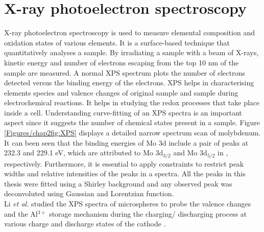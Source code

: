 \section{X-ray photoelectron spectroscopy}
 X-ray photoelectron spectroscopy is used to measure elemental composition and oxidation states of various elements. It is a surface-based technique that quantitatively analyses a sample. By irradiating a sample with a beam of X-rays, kinetic energy and number of electrons escaping from the top 10 nm of the sample are measured. 
A normal XPS spectrum plots the number of electrons detected versus the binding energy of the electrons. XPS helps in characterising elements species and valence changes of original sample and sample during electrochemical reactions. It helps in studying the redox processes that take place inside a cell. Understanding curve-fitting of an XPS spectra is an important aspect since it suggests the number of chemical states present in a sample. Figure \ref{Figures/chap2fig:XPS} displays a detailed narrow spectrum scan of molybdenum. It can been seen that the binding energies of Mo 3d include a pair of peaks at 232.3 and 229.1 eV, which are attributed to Mo 3d$_{3/2}$ and Mo 3d$_{5/2}$ in , respectively\cite{grim_x-ray_1975}. Furthermore, it is essential to apply constraints to restrict peak widths and relative intensities of the peaks in a spectra. All the peaks in this thesis were fitted using a Shirley background and any observed peak was deconvoluted using Gaussian and Lorentzian function. \\
Li \textit{et al.} studied the XPS spectra of  microspheres to probe the valence changes and the Al$^{3+}$ storage mechanism during the charging/ discharging process at various charge and discharge states of the cathode \cite{li_rechargeable_2018}.


